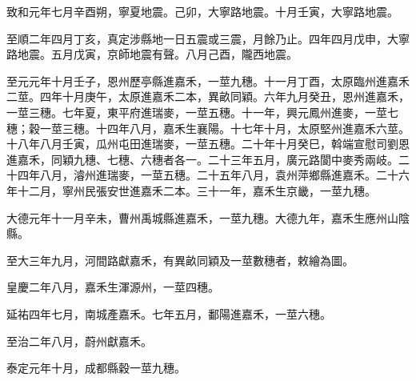 \begin{pinyinscope}
 致和元年七月辛酉朔，寧夏地震。己卯，大寧路地震。十月壬寅，大寧路地震。



 至順二年四月丁亥，真定涉縣地一日五震或三震，月餘乃止。四年四月戊申，大寧路地震。五月戊寅，京師地震有聲。八月己酉，隴西地震。



 至元元年十月壬子，恩州歷亭縣進嘉禾，一莖九穗。十一月丁酉，太原臨州進嘉禾二莖。四年十月庚午，太原進嘉禾二本，異畝同穎。六年九月癸丑，恩州進嘉禾，一莖三穗。七年夏，東平府進瑞麥，一莖五穗。十一年，興元鳳州進麥，一莖七穗；穀一莖三穗。十四年八月，嘉禾生襄陽。十七年十月，太原堅州進嘉禾六莖。十八年八月壬寅，瓜州屯田進瑞麥，一莖五穗。二十年十月癸巳，斡端宣慰司劉恩進嘉禾，同穎九穗、七穗、六穗者各一。二十三年五月，廣元路閬中麥秀兩岐。二十四年八月，濬州進瑞麥，一莖五穗。二十五年八月，袁州萍鄉縣進嘉禾。二十六年十二月，寧州民張安世進嘉禾二本。三十一年，嘉禾生京畿，一莖九穗。



 大德元年十一月辛未，曹州禹城縣進嘉禾，一莖九穗。大德九年，嘉禾生應州山陰縣。



 至大三年九月，河間路獻嘉禾，有異畝同穎及一莖數穗者，敕繪為圖。



 皇慶二年八月，嘉禾生渾源州，一莖四穗。



 延祐四年七月，南城產嘉禾。七年五月，鄱陽進嘉禾，一莖六穗。



 至治二年八月，蔚州獻嘉禾。



 泰定元年十月，成都縣穀一莖九穗。



\end{pinyinscope}